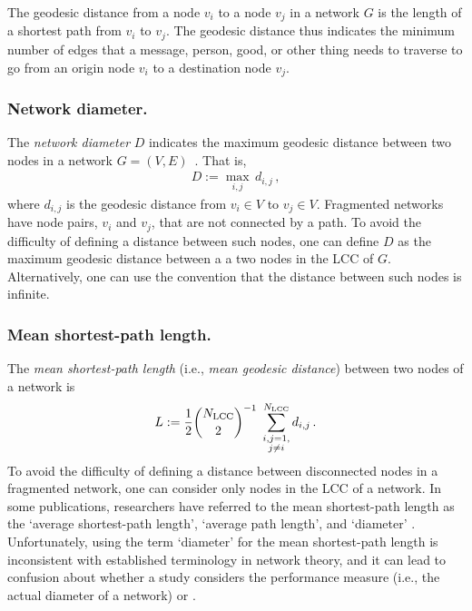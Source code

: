 \documentclass{comnet-mod}
\begin{document}
The geodesic distance from a node $v_i$ to a node $v_j$ in a network $G$ is the length of a shortest path from $v_i$ to $v_j$. The geodesic distance thus indicates the minimum number of edges that a message, person, good, or other thing needs to traverse to go from an origin node $v_i$ to a destination node $v_j$.



\subsubsection{Network diameter.}

The \textit{network diameter} $D$ indicates the maximum geodesic distance between two nodes in a network $G=(V,E)$~\cite[p.\,133]{Newman2018}. That is,
\begin{align}
	D := \max_{i,j} \, d_{i,j}\,,\label{eq:diameter}
\end{align}
where $d_{i,j}$ is the geodesic distance from $v_i \in V$ to $v_j \in V$. Fragmented networks have node pairs, $v_i$ and $v_j$, that are not connected by a path. To avoid the difficulty of defining a distance between such nodes, one can define $D$ as the maximum geodesic distance between a a two nodes in the LCC of $G$. Alternatively, one can use the convention that the distance between such nodes is infinite.
 


\subsubsection{Mean shortest-path length.}

The \textit{mean shortest-path length} (i.e., \textit{mean geodesic distance}) between two nodes of a network is
\begin{align}\label{eq:mspl}
	L := \frac{1}{2}\binom{N_{\textrm{LCC}}}{2}^{-1}\hspace{0.1cm}\sum_{\substack{i,j=1, \\ j\neq i}}^{N_{\textrm{LCC}}} d_{i,j}\,.
\end{align}
To avoid the difficulty of defining a distance between disconnected nodes in a fragmented network, one can consider only nodes in the LCC of a network. In some publications, researchers have referred to the mean shortest-path length  as the `average shortest-path length', `average path length', and `diameter' \cite{Albert2000, Shargel2003, Li2006}. Unfortunately, using the term `diameter' for the mean shortest-path length is inconsistent with established terminology in network theory, and it can lead to confusion about whether a study considers the performance measure  (i.e., the actual diameter of a network) or . 
\end{document}
